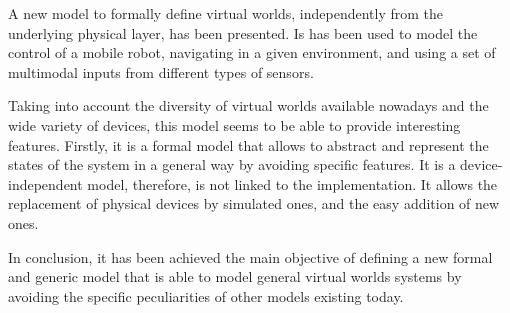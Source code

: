 \documentclass{svmult}
\begin{document}
A new model to formally define virtual worlds, independently from the underlying physical layer, has been presented. Is has been used to model the control of a mobile robot, navigating in a given environment, and using a set of multimodal inputs from different types of sensors.

Taking into account the diversity of virtual worlds available nowadays and the wide variety of devices, this model seems to be able to provide interesting features. Firstly, it is a formal model that allows to abstract and represent the states of the system in a general way by avoiding specific features. It is a device-independent model, therefore, is not linked to the implementation. It allows the replacement of physical devices by simulated ones, and the easy addition of new ones.

In conclusion, it has been achieved the main objective of defining a new formal and generic model that is able to model general virtual worlds systems by avoiding the specific peculiarities of other models existing today.

%
%
\end{document}
